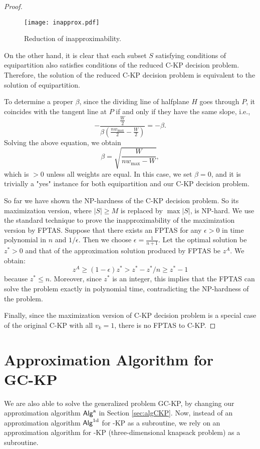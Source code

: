 \documentclass{aamas2013}
\begin{document}
\begin{proof}
\begin{figure}[htb!]
 \centering
 \texttt{[image: inapprox.pdf]} \caption{Reduction of inapproximability.} \label{fig:inapprox}
\end{figure}

On the other hand, it is clear that each subset $S$ satisfying conditions of {\sc equipartition} also satisfies conditions of the reduced {\sc C-KP} decision problem.  Therefore, the solution of the reduced {\sc C-KP} decision problem is equivalent to the solution of {\sc equipartition}.

To determine a proper $\beta$, since the dividing line of halfplane $H$ goes through $P$, it coincides with the tangent line at $P$ if and only if they have the same slope, i.e.,
\[
-\frac{\frac{W}{2}}{\beta(\frac{n w_{\max}}{2} - \frac{W}{2})} 
= -{\beta}.
\]
Solving the above equation, we obtain
\[\beta = \sqrt{\frac{W}{n w_{\max}-W}},
\]
which is $>0$ unless all weights are equal.  In this case, we set $\beta=0$, and it is trivially a "yes" instance for both {\sc equipartition} and our C-KP decision problem.

So far we have shown the NP-hardness of the C-KP decision problem.  So its maximization version, where $|S|\geq M$ is replaced by $\max |S|$, is NP-hard.  We use the standard technique to prove the inapproximability of the maximization version by FPTAS. Suppose that there exists an FPTAS for any $\epsilon > 0$ in time polynomial in $n$ and $1/\epsilon$. Then we choose $\epsilon = \frac{1}{n+1}$. Let the optimal solution be $z^\ast>0$ and that of the approximation solution produced by FPTAS be $z^A$. We obtain:
\[
z^A \ge (1-\epsilon) z^\ast > z^\ast - z^\ast/n \ge z^\ast -1
\]
because $z^\ast \le n$. Moreover, since $z^\ast$ is an integer, this implies that the FPTAS can solve the problem exactly in polynomial time, contradicting the NP-hardness of the problem. 

Finally, since the maximization version of C-KP decision problem is a special case of the original C-KP with all $v_k=1$, there is no FPTAS to {\sc C-KP}. 
\end{proof} 
\section{Approximation Algorithm for \\GC-KP}\label{sec:algGCKP}
\noindent
We are also able to solve the generalized problem {\sc GC-KP}, by changing our approximation algorithm ${\sf Alg}^{\rm a}$ in Section \ref{sec:algCKP}. Now, instead of an approximation algorithm ${\sf Alg}^{\rm 1d}$ for {-KP} as a subroutine, we rely on an approximation algorithm for {-KP} (three-dimensional knapsack problem) as a subroutine. 
\end{document}
